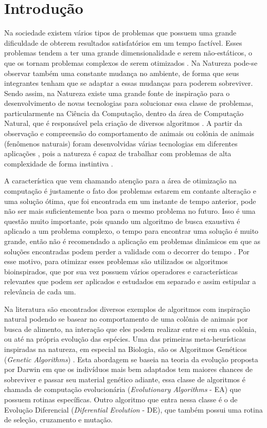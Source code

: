 \chapter{Introdução}
\label{ch:intro}

Na sociedade existem vários tipos de problemas que possuem uma grande dificuldade de obterem resultados satisfatórios em um tempo factível. Esses problemas tendem a ter uma grande dimensionalidade e serem não-estáticos, o que os tornam problemas complexos de serem otimizados \cite{de2004otimizaccao}. Na Natureza pode-se observar também uma constante mudança no ambiente, de forma que seus integrantes tenham que se adaptar a essas mudanças para poderem sobreviver. Sendo assim, na Natureza existe uma grande fonte de inspiração para o desenvolvimento de novas tecnologias para solucionar essa classe de problemas, particularmente na Ciência da Computação, dentro da área de Computação Natural, que é responsável pela criação de diversos algoritmos \cite{de2007fundamentals}. A partir da observação e compreensão do comportamento de animais ou colônia de animais (fenômenos naturais) foram desenvolvidas várias tecnologias em diferentes aplicações \cite{rozenberg2011handbook}, pois a natureza é capaz de trabalhar com problemas de alta complexidade de forma instintiva \cite{andre2015multiple}.

A característica que vem chamando atenção para a área de otimização na computação é justamente o fato dos problemas estarem em contante alteração e uma solução ótima, que foi encontrada em um instante de tempo anterior, pode não ser mais suficientemente boa para o mesmo problema no futuro. Isso é uma questão muito importante, pois quando um algoritmo de busca exaustiva é aplicado a um problema complexo, o tempo para encontrar uma solução é muito grande, então não é recomendado a aplicação em problemas dinâmicos em que as soluções encontradas podem perder a validade com o decorrer do tempo \cite{morrison2003performance}. Por esse motivo, para otimizar esses problemas são utilizados os algoritmos bioinspirados, que por sua vez possuem vários operadores e características relevantes que podem ser aplicados e estudados em separado e assim estipular a relevância de cada um.

Na literatura são encontrados diversos exemplos de algoritmos com inspiração natural podendo se basear no comportamento de uma colônia de animais por busca de alimento, na interação que eles podem realizar entre si em sua colônia, ou até na própria evolução das espécies. Uma das primeiras meta-heurísticas inspiradas na natureza, em especial na Biologia, são os Algoritmos Genéticos (\textit{Genetic Algorithms}) \cite{holland1975adaptation}. Esta abordagem se baseia na teoria da evolução proposta por Darwin em que os indivíduos mais bem adaptados tem maiores chances de sobreviver e passar seu material genético adiante, essa classe de algoritmos é chamada de computação evolucionária (\textit{Evolutionary Algorithms} - EA) que possuem rotinas específicas. Outro algoritmo que entra nessa classe é o de Evolução Diferencial (\textit{Diferential Evolution} - DE), que também possui uma rotina de seleção, cruzamento e mutação. 

